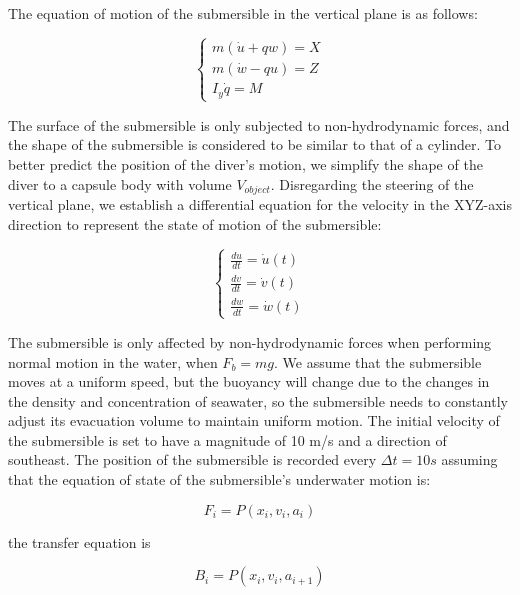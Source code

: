 \documentclass[12pt]{article}
\begin{document}
The equation of motion of the submersible in the vertical plane is as follows:

\begin{equation}
    \left\{
    \begin{aligned}
        m(\dot{u}+qw)=X \\
        m(\dot{w}-qu)=Z \\
        I_y\dot{q}=M
    \end{aligned}
    \right.
\end{equation}

The surface of the submersible is only subjected to non-hydrodynamic forces, and the shape of the submersible is considered to be similar to that of a cylinder. To better predict the position of the diver's motion, we simplify the shape of the diver to a capsule body with volume $V_{object}$. Disregarding the steering of the vertical plane, we establish a differential equation for the velocity in the XYZ-axis direction to represent the state of motion of the submersible:

\begin{equation}
    \left\{
    \begin{aligned}
        \frac{du}{dt}=\dot{u}(t) \\
        \frac{dv}{dt}=\dot{v}(t) \\
        \frac{dw}{dt}=\dot{w}(t)
    \end{aligned}
    \right.
\end{equation}

The submersible is only affected by non-hydrodynamic forces when performing normal motion in the water, when $F_{b}=mg$. We assume that the submersible moves at a uniform speed, but the buoyancy will change due to the changes in the density and concentration of seawater, so the submersible needs to constantly adjust its evacuation volume to maintain uniform motion. The initial velocity of the submersible is set to have a magnitude of 10 m/s and a direction of southeast. The position of the submersible is recorded every $\Delta t=10s$ assuming that the equation of state of the submersible's underwater motion is:

\begin{equation}
    F_i=P(x_i,v_i,a_i)
\end{equation}

the transfer equation is

\begin{equation}
    B_i=P(x_i,v_i,a_{i+1})
\end{equation}
\end{document}
